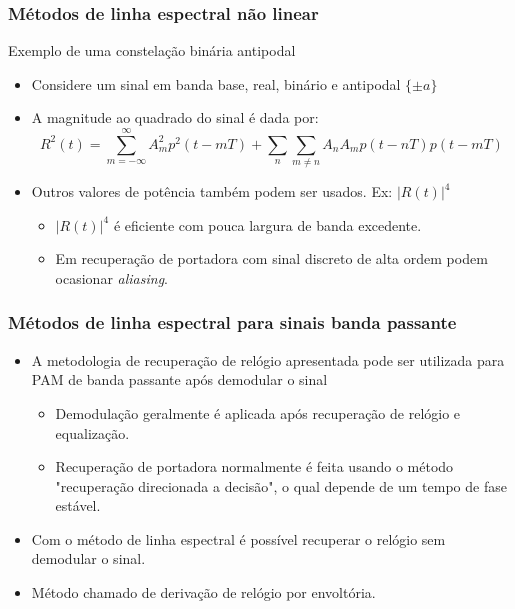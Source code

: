 \begin{frame}
	\frametitle{Métodos de linha espectral não linear}
	\begin{block}{Exemplo de uma constelação binária antipodal}
		\begin{itemize}
			\item Considere um sinal em banda base, real, binário e antipodal $\{\pm a\}$
			\item A magnitude ao quadrado do sinal é dada por:
			\begin{equation*}
			R^2(t)= \sum_{m=-\infty}^{\infty} A_m^2p^2\left(t-mT\right) + \sum_{n}\sum_{m\neq n} A_nA_mp\left(t-nT\right)p\left(t-mT\right)
			\end{equation*}
		\end{itemize}

	\end{block}

\begin{itemize}
	\item Outros valores de potência também podem ser usados. Ex: $|R(t)|^4$
	\begin{itemize}
		\item $|R(t)|^4$ é eficiente com pouca largura de banda excedente.
		\item Em recuperação de portadora com sinal discreto de alta ordem podem ocasionar \textit{aliasing}.
	\end{itemize}
\end{itemize}
\end{frame}


\begin{frame}
	\frametitle{Métodos de linha espectral para sinais banda passante}
	\begin{itemize}
		\item A metodologia de recuperação de relógio apresentada pode ser utilizada para PAM de banda passante após demodular o sinal
		\begin{itemize}
			\item Demodulação geralmente é aplicada após recuperação de relógio e equalização.
			\item Recuperação de portadora normalmente é feita usando o método "recuperação direcionada a decisão", o qual depende de um tempo de fase estável.
		\end{itemize}
		\item Com o método de linha espectral é possível recuperar o relógio sem demodular o sinal.
		\item Método chamado de derivação de relógio por envoltória.
	\end{itemize}
\end{frame}



